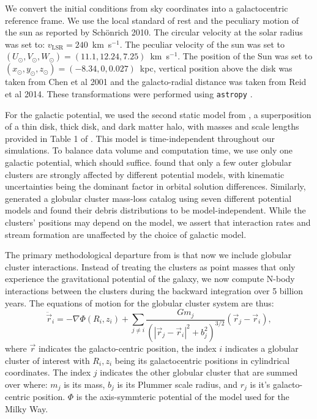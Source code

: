 \documentclass[draft]{aa}
\begin{document}
    We convert the initial conditions from sky coordinates into a galactocentric reference frame. We use the local standard of rest and the peculiary motion of the sun as reported by Sch\"onrich 2010. The circular velocity at the solar radius was set to: $v_{\text{LSR}} = 240$~km~s$^{-1}$. The peculiar velocity of the sun was set to $(U_\odot, V_\odot, W_\odot)=(11.1, 12.24, 7.25)$~km~s$^{-1}$. The position of the Sun was set to $(x_\odot,y_\odot,z_\odot) = (-8.34,0,0.027)$~kpc, vertical position above the disk was taken from Chen et al 2001 and the galacto-radial distance was taken from Reid et al 2014. These transformations were performed using \texttt{astropy} \citep{2013A&A...558A..33A}.


    For the galactic potential, we used the second static model from \citet{2017A&A...598A..66P}, a superposition of a thin disk, thick disk, and dark matter halo, with masses and scale lengths provided in Table 1 of \citet{2023A&A...673A..44F}. This model is time-independent throughout our simulations. To balance data volume and computation time, we use only one galactic potential, which should suffice. \citet{2021MNRAS.505.5978V} found that only a few outer globular clusters are strongly affected by different potential models, with kinematic uncertainties being the dominant factor in orbital solution differences. Similarly, \citet{2024MNRAS.528.5189G} generated a globular cluster mass-loss catalog using seven different potential models and found their debris distributions to be model-independent. While the clusters' positions may depend on the model, we assert that interaction rates and stream formation are unaffected by the choice of galactic model.    

    The primary methodological departure from \citet{2023A&A...673A..44F} is that now we include globular cluster interactions. Instead of treating the clusters as point masses that only experience the gravitational potential of the galaxy, we now compute N-body interactions between the clusters during the backward integration over 5 billion years. The equations of motion for the globular cluster system are thus: 
    \begin{equation}
      \ddot{\vec{r}}_i = -\nabla \Phi(R_i,z_i) + \left.\sum_{j\neq i} \frac{Gm_j}{\left(|\vec{r}_j - \vec{r}_i|^2 + b_j^2\right)^{3/2}}\right. \left(\vec{r}_j - \vec{r}_i\right),
    \end{equation}\label{eq:GCNBody} where $\vec{r}$ indicates the galacto-centric position, the index $i$ indicates a globular cluster of interest with $R_i,z_i$ being its galactocentric positions in cylindrical coordinates. The index $j$ indicates the other globular cluster that are summed over where: $m_j$ is its mass, $b_j$ is its Plummer scale radius, and $r_j$ is it's galacto-centric position. $\Phi$ is the axis-symmteric potential of the model used for the Milky Way. 
\end{document}
